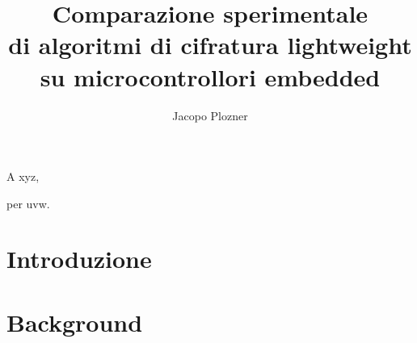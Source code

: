 \documentclass[target=bach,aauheader=,style=]{thud}
\title{Comparazione sperimentale \\ di algoritmi di cifratura lightweight \\ su microcontrollori embedded}
\author{Jacopo Plozner}
\begin{document}
\maketitle

\begin{dedication}
	A xyz,\par per uvw.
\end{dedication}

\acknowledgements


\abstract


\tableofcontents



\mainmatter


\chapter{Introduzione}



\chapter{Background}
\end{document}
